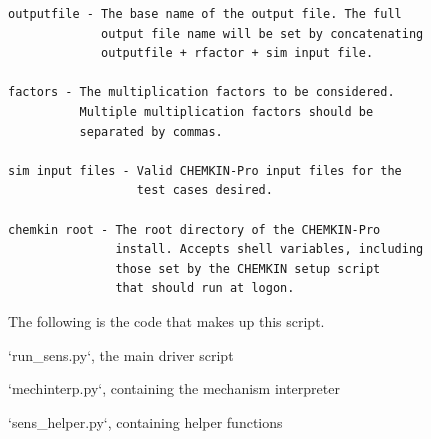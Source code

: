 \documentclass[12pt, letterpaper, oneside, draft]{book}
\begin{document}
\begin{appendices}
\begin{singlespace}
{\begin{Verbatim}
outputfile - The base name of the output file. The full
             output file name will be set by concatenating
             outputfile + rfactor + sim input file.

factors - The multiplication factors to be considered.
          Multiple multiplication factors should be
          separated by commas.

sim input files - Valid CHEMKIN-Pro input files for the
                  test cases desired.

chemkin root - The root directory of the CHEMKIN-Pro
               install. Accepts shell variables, including
               those set by the CHEMKIN setup script
               that should run at logon.
\end{Verbatim}

The following is the code that makes up this script.

\cleardoublepage

{\Large `run\_sens.py`, the main driver script}


\cleardoublepage

{\Large `mechinterp.py`, containing the mechanism interpreter}


\cleardoublepage

{\Large `sens\_helper.py`, containing helper functions}

}
\end{singlespace}
\end{appendices}
\end{document}
